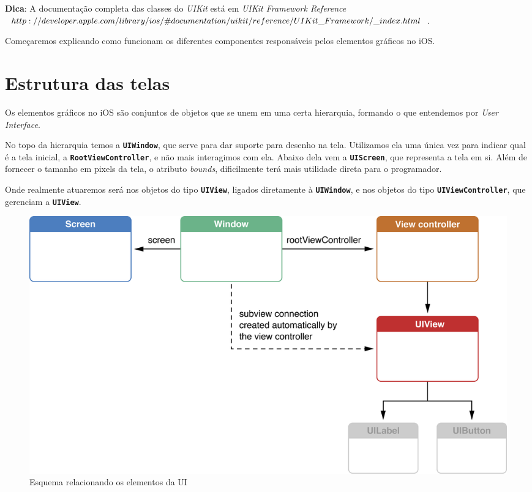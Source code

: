 \documentclass[a4paper,12pt,brazil,doubleside]{book}
\begin{document}
\begin{singlespace}
\begin{framed}

\textbf{Dica}:  A documentação completa das classes do \textit{UIKit} está em 
\textit{ UIKit Framework Reference\\ \(http://developer.apple.com/library/ios/\#documentation/uikit/reference/\\UIKit\_Framework/\_index.html\)}.
\end{framed}


Começaremos explicando como funcionam os diferentes componentes responsáveis pelos elementos gráficos no iOS.

\section{Estrutura das telas}


Os elementos gráficos no iOS são conjuntos de objetos que se unem em uma certa hierarquia, formando o que entendemos por \emph{User Interface}.

No topo da hierarquia temos a \texttt{\textbf{UIWindow}}, que serve para dar suporte para desenho na tela. Utilizamos ela uma única vez para indicar qual é a tela inicial, a \texttt{\textbf{RootViewController}}, e não mais interagimos com ela. Abaixo dela vem a \texttt{\textbf{UIScreen}}, que representa a tela em si. Além de fornecer o tamanho em pixels da tela, o atributo \emph{bounds}, dificilmente terá mais utilidade direta para o programador.

Onde realmente atuaremos será nos objetos do tipo \texttt{\textbf{UIView}}, ligados diretamente à \texttt{\textbf{UIWindow}}, e nos objetos do tipo \texttt{\textbf{UIViewController}}, que gerenciam a \texttt{\textbf{UIView}}.

\bigskip
\bigskip

\begin{figure}[H]
  \centering
  \includegraphics[width=.75\textwidth]{figuras/apple_window_view_controller_screen.png}
  \caption{Esquema relacionando os elementos da UI}
  \label{fig:relacionamento_UI}
\end{figure}


\end{singlespace}
\end{document}
